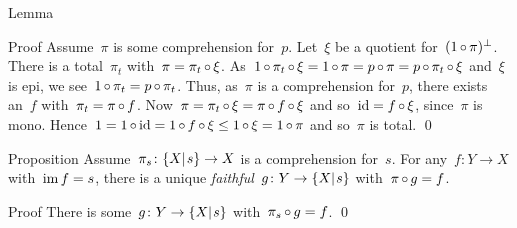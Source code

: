 \documentclass[b]{subfiles}
\begin{document}
\begin{parsec}
\begin{point}{Lemma}
\begin{point}{Proof}
Assume~$\pi$ is some comprehension for~$p$.
Let~$\xi$ be a quotient for~$(1 \mathop{\circ} \pi)^\perp$.
There is a total~$\pi_t$ with~$\pi = \pi_t \mathop{\circ} \xi$.
As~$ 1 \mathop{\circ} \pi_t \mathop{\circ} \xi
        = 1 \mathop{\circ} \pi
        = p \mathop{\circ} \pi
        = p \mathop{\circ} \pi_t \mathop{\circ} \xi$
        and~$\xi$ is epi,
        we see~$1 \mathop{\circ} \pi_t = p \mathop{\circ} \pi_t$.
Thus, as~$\pi$ is a comprehension for~$p$,
    there exists an~$f$ with~$\pi_t = \pi \mathop{\circ} f$.
Now~$\pi = \pi_t \mathop{\circ} \xi = \pi \mathop{\circ} f \mathop{\circ} \xi$
    and so~$\operatorname{id} = f \mathop{\circ} \xi$, since~$\pi$ is mono.
Hence~$1 = 1 \mathop{\circ} \operatorname{id} =1 \mathop{\circ} f \mathop{\circ} \xi \leq 1 \mathop{\circ} \xi = 1 \mathop{\circ} \pi$
    and so~$\pi$ is total. \qed
\end{point}
\end{point}
\begin{point}{Proposition}%
Assume~$\pi_s\colon \{X|{\kern.2ex}s\} \to X$ is a comprehension for~$s$.
For any~$f\colon Y \to X$ with~$\operatorname{im} f = s$,
    there is a unique \emph{faithful}~$g\colon Y \to \{X|{\kern.2ex}s\}$
    with~$\pi \mathop{\circ} g = f$.
\begin{point}{Proof}
There is some~$g \colon Y \to \{X|{\kern.2ex}s\}$ with~$\pi_s \mathop{\circ} g = f$. \qed
\TODO{}
\end{point}
\end{point}
\end{parsec}
\end{document}
